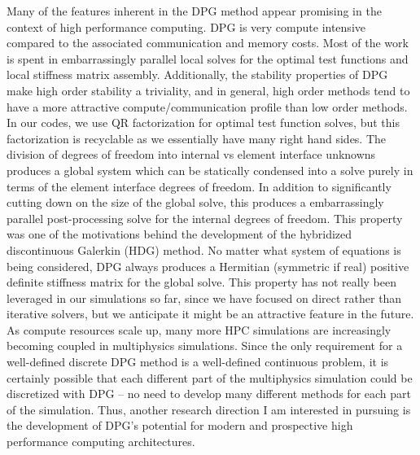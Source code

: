 \documentclass[letterpaper,12pt]{article}
\begin{document}
Many of the features inherent in the DPG method appear promising in the context of high performance computing.
DPG is very compute intensive compared to the associated communication and memory costs.
Most of the work is spent in embarrassingly parallel local solves for the optimal test functions and local stiffness matrix assembly.
Additionally, the stability properties of DPG make high order stability a triviality, and in general, 
high order methods tend to have a more attractive compute/communication profile than low order methods.
In our codes, we use QR factorization for optimal test function solves, but this factorization is recyclable as we essentially have many right hand sides.
The division of degrees of freedom into internal vs element interface unknowns produces a global system which can be statically condensed into 
a solve purely in terms of the element interface degrees of freedom.
In addition to significantly cutting down on the size of the global solve, 
this produces a embarrassingly parallel post-processing solve for the internal degrees of freedom.
This property was one of the motivations behind the development of the hybridized discontinuous Galerkin (HDG) \cite{HDG} method.
No matter what system of equations is being considered, DPG always produces a Hermitian (symmetric if real) 
positive definite stiffness matrix for the global solve.
This property has not really been leveraged in our simulations so far, since we have focused on direct rather than iterative solvers, but we
anticipate it might be an attractive feature in the future.
As compute resources scale up, many more HPC simulations are increasingly becoming coupled in multiphysics simulations.
Since the only requirement for a well-defined discrete DPG method is a well-defined continuous problem, 
it is certainly possible that each different part of the multiphysics simulation could be discretized with DPG -- 
no need to develop many different methods for each part of the simulation.
Thus, another research direction I am interested in pursuing is the development of DPG's potential 
for modern and prospective high performance computing architectures.
\end{document}

